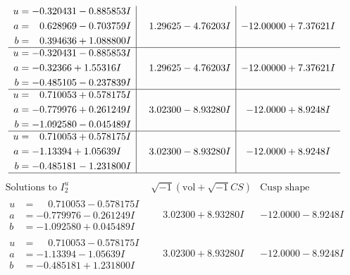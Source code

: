 \documentclass[1p]{elsarticle_modified}
\theoremstyle{definition}
\newcommand{\I}{\sqrt{-1}}
\begin{document}
$$\begin{array}{c|c|c}
\begin{aligned}
u &= -0.320431 - 0.885853 I \\
a &= \phantom{-}0.628969 - 0.703759 I \\
b &= \phantom{-}0.394636 + 1.088800 I\end{aligned}
 & \phantom{-}1.29625 - 4.76203 I & -12.00000 + 7.37621 I \\ \hline\begin{aligned}
u &= -0.320431 - 0.885853 I \\
a &= -0.32366 + 1.55316 I \\
b &= -0.485105 - 0.237839 I\end{aligned}
 & \phantom{-}1.29625 - 4.76203 I & -12.00000 + 7.37621 I \\ \hline\begin{aligned}
u &= \phantom{-}0.710053 + 0.578175 I \\
a &= -0.779976 + 0.261249 I \\
b &= -1.092580 - 0.045489 I\end{aligned}
 & \phantom{-}3.02300 - 8.93280 I & -12.0000 + 8.9248 I \\ \hline\begin{aligned}
u &= \phantom{-}0.710053 + 0.578175 I \\
a &= -1.13394 + 1.05639 I \\
b &= -0.485181 - 1.231800 I\end{aligned}
 & \phantom{-}3.02300 - 8.93280 I & -12.0000 + 8.9248 I\\
 \hline 
 \end{array}$$\newpage$$\begin{array}{c|c|c}  
\text{Solutions to }I^u_{2}& \I (\text{vol} + \sqrt{-1}CS) & \text{Cusp shape}\\
 \hline 
\begin{aligned}
u &= \phantom{-}0.710053 - 0.578175 I \\
a &= -0.779976 - 0.261249 I \\
b &= -1.092580 + 0.045489 I\end{aligned}
 & \phantom{-}3.02300 + 8.93280 I & -12.0000 - 8.9248 I \\ \hline\begin{aligned}
u &= \phantom{-}0.710053 - 0.578175 I \\
a &= -1.13394 - 1.05639 I \\
b &= -0.485181 + 1.231800 I\end{aligned}
 & \phantom{-}3.02300 + 8.93280 I & -12.0000 - 8.9248 I \\ \hline\begin{aligned}

\end{aligned}
\end{array}$$
\end{document}
